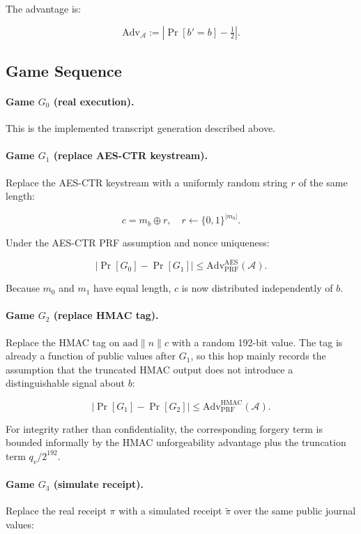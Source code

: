 The advantage is:

\[
\mathrm{Adv}_{\mathcal{A}} :=
\left| \Pr[b' = b] - \tfrac{1}{2} \right|.
\]

\subsection{Game Sequence}

\paragraph{Game \(G_0\) (real execution).}
This is the implemented transcript generation described above.

\paragraph{Game \(G_1\) (replace AES-CTR keystream).}
Replace the AES-CTR keystream with a uniformly random string \(r\) of the same
length:

\[
c = m_b \oplus r, \quad r \leftarrow \{0,1\}^{|m_b|}.
\]

Under the AES-CTR PRF assumption and nonce uniqueness:

\[
|\Pr[G_0] - \Pr[G_1]| \leq
\mathrm{Adv}_{\mathrm{PRF}}^{\mathrm{AES}}(\mathcal{A}).
\]

Because \(m_0\) and \(m_1\) have equal length, \(c\) is now distributed
independently of \(b\).

\paragraph{Game \(G_2\) (replace HMAC tag).}
Replace the HMAC tag on \(\mathrm{aad} \parallel n \parallel c\) with a random
192-bit value. The tag is already a function of public values after \(G_1\), so
this hop mainly records the assumption that the truncated HMAC output does not
introduce a distinguishable signal about \(b\):

\[
|\Pr[G_1] - \Pr[G_2]| \leq
\mathrm{Adv}_{\mathrm{PRF}}^{\mathrm{HMAC}}(\mathcal{A}).
\]

For integrity rather than confidentiality, the corresponding forgery term is
bounded informally by the HMAC unforgeability advantage plus the truncation term
\(q_v / 2^{192}\).

\paragraph{Game \(G_3\) (simulate receipt).}
Replace the real receipt \(\pi\) with a simulated receipt \(\tilde{\pi}\) over the
same public journal values:


